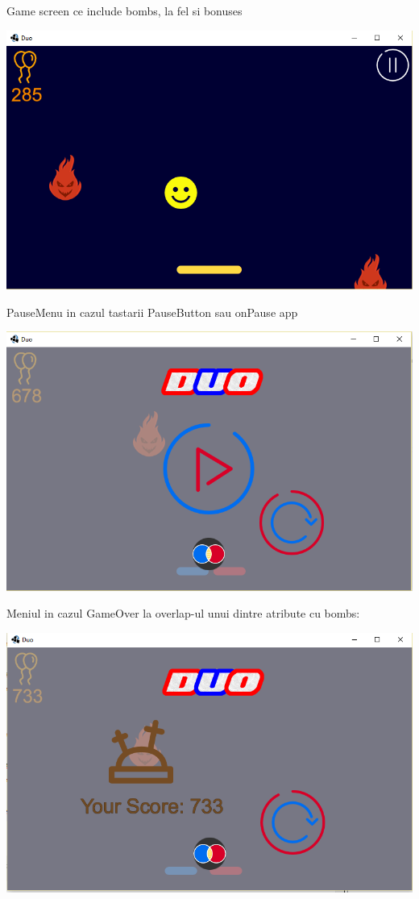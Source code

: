 \newline \newline
Game screen ce include bombs, la fel si bonuses
\begin{center}
\includegraphics[width=0.6\linewidth]{screenshot012}
\end{center}

\newline \newline
PauseMenu in cazul tastarii PauseButton sau onPause app
\begin{center}
\includegraphics[width=0.7\linewidth]{screenshot013}
\end{center}

\newline \newline
Meniul in cazul GameOver la overlap-ul unui dintre atribute cu bombs:
\begin{center}
\includegraphics[width=0.7\linewidth]{screenshot014}
\end{center}
















\clearpage